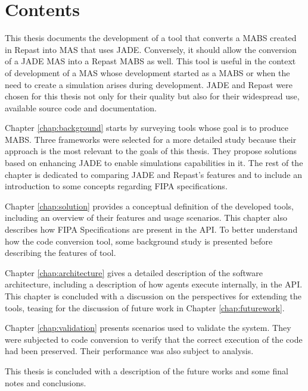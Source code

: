 
\section{Contents}

This thesis documents the development of a tool that converts a MABS created in Repast into MAS that uses JADE. Conversely, it should allow the conversion of a JADE MAS into a Repast MABS as well. This tool is useful in the context of development of a MAS whose development started as a MABS or when the need to create a simulation arises during development. JADE and Repast were chosen for this thesis not only for their quality but also for their widespread use, available source code and documentation.

Chapter \ref{chap:background} starts by surveying tools whose goal is to produce MABS. Three frameworks were selected for a more detailed study because their approach is the most relevant to the goals of this thesis. They propose solutions based on enhancing JADE to enable simulations capabilities in it. The rest of the chapter is dedicated to comparing JADE and Repast's features and to include an introduction to some concepts regarding FIPA specifications.

Chapter \ref{chap:solution} provides a conceptual definition of the developed tools, including an overview of their features and usage scenarios. This chapter also describes how FIPA Specifications are present in the API. To better understand how the code conversion tool, some background study is presented before describing the features of tool.

Chapter \ref{chap:architecture} gives a detailed description of the software architecture, including a description of how agents execute internally, in the API. This chapter is concluded with a discussion on the perspectives for extending the tools, teasing for the discussion of future work in Chapter \ref{chap:futurework}.

Chapter \ref{chap:validation} presents scenarios used to validate the system. They were subjected to code conversion to verify that the correct execution of the code had been preserved. Their performance was also subject to analysis.

This thesis is concluded with a description of the future works and some final notes and conclusions.